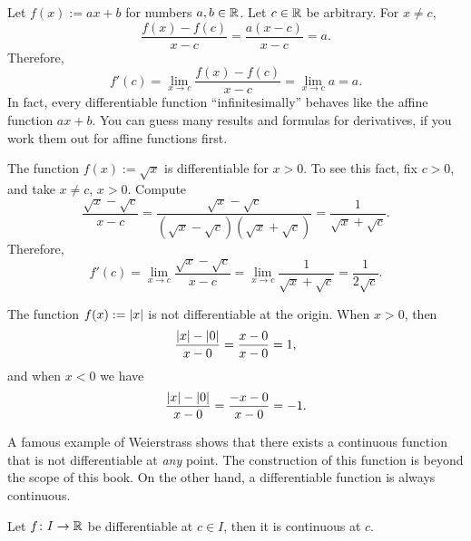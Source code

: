 \begin{example}
Let $f(x) := ax + b$ for numbers $a, b \in {\mathbb{R}}$.
Let $c \in {\mathbb{R}}$ be arbitrary.
For $x \not=c$,
\begin{equation*}
\frac{f(x)-f(c)}{x-c} =
\frac{a(x-c)}{x-c} = a .
\end{equation*}
Therefore,
\begin{equation*}
f'(c) =
\lim_{x\to c} 
\frac{f(x)-f(c)}{x-c} =
\lim_{x\to c} 
a = a.
\end{equation*}
In fact, every differentiable function ``infinitesimally'' behaves like
the affine function $ax + b$.  You can guess many results
and formulas for derivatives, if you work them out for affine functions
first.
\end{example}

\begin{example}
The function $f(x) := \sqrt{x}$ is differentiable for $x > 0$.  To see this
fact, fix $c > 0$,
and take $x \not= c$, $x > 0$.  Compute
\begin{equation*}
\frac{\sqrt{x}-\sqrt{c}}{x-c}
=
\frac{\sqrt{x}-\sqrt{c}}{(\sqrt{x}-\sqrt{c})(\sqrt{x}+\sqrt{c})}
=
\frac{1}{\sqrt{x}+\sqrt{c}} .
\end{equation*}
Therefore,
\begin{equation*}
f'(c) =
\lim_{x\to c}
\frac{\sqrt{x}-\sqrt{c}}{x-c}
=
\lim_{x\to c}
\frac{1}{\sqrt{x}+\sqrt{c}}
=
\frac{1}{2\sqrt{c}} .
\end{equation*}
\end{example}

\begin{example}
The function $f(x) := \left\lvert {x} \right\rvert$ is not differentiable
at the origin.  When $x > 0$, then
\begin{equation*}
\frac{\left\lvert {x} \right\rvert-\left\lvert {0} \right\rvert}{x-0} =
\frac{x-0}{x-0} = 1 ,
\end{equation*}
and when $x < 0$ we have
\begin{equation*}
\frac{\left\lvert {x} \right\rvert-\left\lvert {0} \right\rvert}{x-0} =
\frac{-x-0}{x-0} = -1 .
\end{equation*}
\end{example}

A famous example of Weierstrass shows that there exists a continuous
function that is not differentiable at \emph{any} point.  The construction
of this function is beyond the scope of this book.  On the other hand,
a differentiable function
is always continuous.

\begin{prop}
Let $f \colon I \to {\mathbb{R}}$ be differentiable at $c \in I$,
then it is continuous at $c$.
\end{prop}

